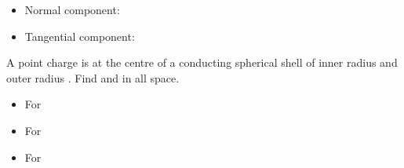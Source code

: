 \begin{ELjoin}

\begin{itemize}
\item
  Normal component:
\item
  Tangential component:
\end{itemize}


\begin{ELexample}{}

A point charge  is at the centre of a conducting spherical shell of inner radius  and outer radius . Find  and  in all space.


\begin{ELsolution}


\begin{itemize}
\tightlist
\item
  For 
\end{itemize}


\begin{itemize}
\tightlist
\item
  For 
\end{itemize}


\begin{itemize}
\tightlist
\item
  For 
\end{itemize}



\end{ELsolution}

\end{ELexample}

\end{ELjoin}


